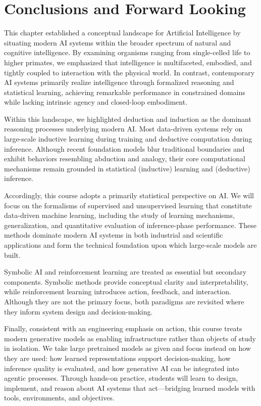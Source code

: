 \documentclass[12pt]{article}
\begin{document}
\section{Conclusions and Forward Looking}
This chapter established a conceptual landscape for Artificial Intelligence by situating modern AI systems within the broader spectrum of natural and cognitive intelligence. By examining organisms ranging from single-celled life to higher primates, we emphasized that intelligence is multifaceted, embodied, and tightly coupled to interaction with the physical world. In contrast, contemporary AI systems primarily realize intelligence through formalized reasoning and statistical learning, achieving remarkable performance in constrained domains while lacking intrinsic agency and closed-loop embodiment.

Within this landscape, we highlighted deduction and induction as the dominant reasoning processes underlying modern AI. Most data-driven systems rely on large-scale inductive learning during training and deductive computation during inference. Although recent foundation models blur traditional boundaries and exhibit behaviors resembling abduction and analogy, their core computational mechanisms remain grounded in statistical (inductive) learning and (deductive) inference.

Accordingly, this course adopts a primarily statistical perspective on AI. We will focus on the formalisms of supervised and unsupervised learning that constitute data-driven machine learning, including the study of learning mechanisms, generalization, and quantitative evaluation of inference-phase performance. These methods dominate modern AI systems in both industrial and scientific applications and form the technical foundation upon which large-scale models are built.

Symbolic AI and reinforcement learning are treated as essential but secondary components. Symbolic methods provide conceptual clarity and interpretability, while reinforcement learning introduces action, feedback, and interaction. Although they are not the primary focus, both paradigms are revisited where they inform system design and decision-making.

Finally, consistent with an engineering emphasis on action, this course treats modern generative models as enabling infrastructure rather than objects of study in isolation. We take large pretrained models as given and focus instead on how they are used: how learned representations support decision-making, how inference quality is evaluated, and how generative AI can be integrated into agentic processes. Through hands-on practice, students will learn to design, implement, and reason about AI systems that act—bridging learned models with tools, environments, and objectives.
\end{document}
